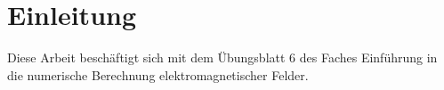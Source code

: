 \chapter{Einleitung}\label{sec:intro}
Diese Arbeit beschäftigt sich mit dem Übungsblatt 6 des Faches \glqq Einführung in die numerische Berechnung elektromagnetischer Felder\grqq{}.